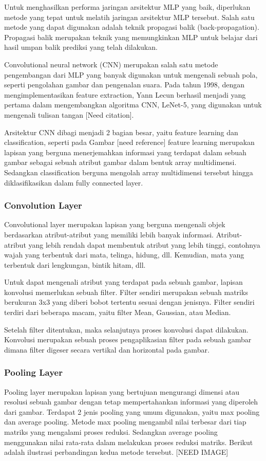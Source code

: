 Untuk menghasilkan performa jaringan arsitektur MLP yang baik, diperlukan metode yang tepat untuk melatih jaringan arsitektur MLP tersebut. Salah satu metode yang dapat digunakan adalah teknik propagasi balik (back-propagation). Propagasi balik merupakan teknik yang memungkinkan MLP untuk belajar dari hasil umpan balik prediksi yang telah dilakukan.

Convolutional neural network (CNN) merupakan salah satu metode pengembangan dari MLP yang banyak digunakan untuk mengenali sebuah pola, seperti pengolahan gambar dan pengenalan suara. Pada tahun 1998, dengan mengimplementasikan feature extraction, Yann Lecun berhasil menjadi yang pertama dalam mengembangkan algoritma CNN, LeNet-5, yang digunakan untuk mengenali tulisan tangan [Need citation].

Arsitektur CNN dibagi menjadi 2 bagian besar, yaitu feature learning dan classification, seperti pada Gambar [need reference] feature learning merupakan lapisan yang berguna menerjemahkan informasi yang terdapat dalam sebuah gambar sebagai sebuah atribut gambar dalam bentuk array multidimensi. Sedangkan classification berguna mengolah array multidimensi tersebut hingga diklasifikasikan dalam fully connected layer.

\subsubsection{Convolution Layer}
Convolutional layer merupakan lapisan yang berguna mengenali objek berdasarkan atribut-atribut yang memiliki lebih banyak informasi. Atribut-atribut yang lebih rendah dapat membentuk atribut yang lebih tinggi, contohnya wajah yang terbentuk dari mata, telinga, hidung, dll. Kemudian, mata yang terbentuk dari lengkungan, bintik hitam, dll.

Untuk dapat mengenali atribut yang terdapat pada sebuah gambar, lapisan konvolusi memerlukan sebuah filter. Filter sendiri merupakan sebuah matriks berukuran 3x3 yang diberi bobot tertentu sesuai dengan jenisnya. Filter sendiri terdiri dari beberapa macam, yaitu filter Mean, Gaussian, atau Median.

Setelah filter ditentukan, maka selanjutnya proses konvolusi dapat dilakukan. Konvolusi merupakan sebuah proses pengaplikasian filter pada sebuah gambar dimana filter digeser secara vertikal dan horizontal pada gambar.

\subsubsection{Pooling Layer}
Pooling layer merupakan lapisan yang bertujuan mengurangi dimensi atau resolusi sebuah gambar dengan tetap mempertahankan informasi yang diperoleh dari gambar. Terdapat 2 jenis pooling yang umum digunakan, yaitu max pooling dan average pooling. Metode max pooling mengambil nilai terbesar dari tiap matriks yang mengalami proses reduksi. Sedangkan average pooling menggunakan nilai rata-rata dalam melakukan proses reduksi matriks. Berikut adalah ilustrasi perbandingan kedua metode tersebut. [NEED IMAGE]

